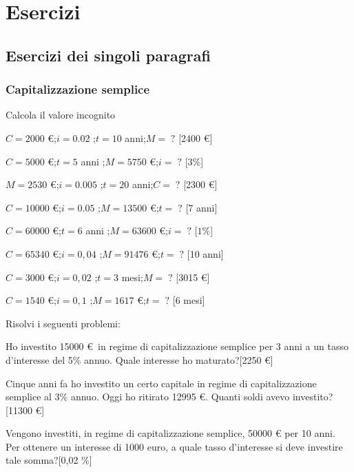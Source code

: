 
\section{Esercizi}

\subsection{Esercizi dei singoli paragrafi}

\subsubsection{Capitalizzazione semplice}

\begin{esercizio}
Calcola il valore incognito
 \begin{enumeratea}
 \item $C = 2000$ \euro ;\quad $i = 0.02$ ;\quad $t = 10$ anni;\quad $M=\;?$ \hfill [2400 \euro]
 \item $C = 5000$ \euro ;\quad $t = 5$ anni ;\quad $M = 5750$ \euro;\quad $i=\;?$ \hfill [$3 \%$]
 \item $M = 2530$ \euro ;\quad $i = 0.005$ ;\quad $t = 20$ anni;\quad $C=\;?$ \hfill [2300 \euro]
 \item $C = 10000$ \euro ;\quad $i = 0.05$ ;\quad $M = 13500$ \euro;\quad $t=\;?$ \hfill [7 anni]
 \item $C = 60000$ \euro ;\quad $t = 6$ anni ;\quad $M = 63600$ \euro;\quad $i=\;?$ \hfill [$1 \%$]
 \item $C = 65340$ \euro ;\quad $i = 0,04$ ;\quad $M = 91476$ \euro;\quad $t=\;?$ \hfill [10 anni]
 \item $C = 3000$ \euro ;\quad $i = 0,02$ ;\quad $t = 3$ mesi;\quad $M=\;?$ \hfill [3015 \euro]
 \item $C = 1540$ \euro ;\quad $i = 0,1$ ;\quad $M = 1617$ \euro;\quad $t=\;?$ \hfill [6 mesi]
 \end{enumeratea}
\end{esercizio}


\begin{esercizio}
Risolvi i seguenti problemi:
 \begin{enumeratea}
  \item Ho investito 15000 \euro\, in regime di capitalizzazione semplice per 3 anni a un tasso d'interesse del 5\% annuo. Quale interesse ho maturato?\hfill [2250 \euro]
  \item Cinque anni fa ho investito un certo capitale in regime di capitalizzazione semplice al 3\% annuo. Oggi ho ritirato 12995 \euro. Quanti soldi avevo investito?\hfill [11300 \euro]
  \item Vengono investiti, in regime di capitalizzazione semplice, 50000 \euro\; per 10 anni. Per ottenere un interesse di 1000 euro, a quale tasso d'interesse si deve investire tale somma?\hfill [0,02 \%]
 \end{enumeratea}
\end{esercizio}
